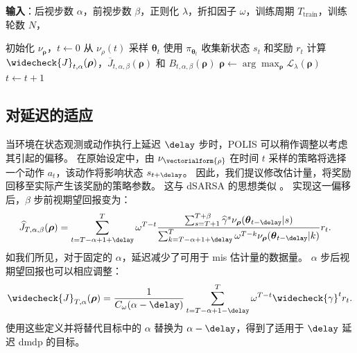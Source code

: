 \begin{algorithm}[t]
\caption{使用 POLIS 的终身学习}
\label{alg:cap}
\textbf{输入}：后视步数 $\alpha$，前视步数 $\beta$，正则化 $\lambda$，折扣因子 $\omega$，训练周期 $T_{\text{train}}$，训练轮数 $N$，
\begin{algorithmic}[1]
\STATE 初始化 $\nu_{\boldsymbol{\rho}}$，$t \gets 0$
    \STATE 从 $\nu_{\rho}(t)$ 采样 $\boldsymbol{\theta}_t$
    \STATE 使用 $\pi_{\boldsymbol{\theta}_t}$ 收集新状态 $s_t$ 和奖励 $r_t$
            \STATE 计算 $\widecheck{J}_{t,\alpha}({\boldsymbol{\rho}})$，$\overline{J}_{t,\alpha,\beta}({\boldsymbol{\rho}})$ 和 $B_{t,\alpha,\beta}(\boldsymbol{\rho})$
            \STATE $\boldsymbol{\rho} \gets \arg\max_{\boldsymbol{\rho}} \mathcal{L}_{\lambda}(\boldsymbol{\rho})$
         \ENDFOR
    \ENDIF
    \STATE $t \gets t+1$
\ENDWHILE
\end{algorithmic}
\end{algorithm}



\subsection{对延迟的适应}
\label{subsec:extension_delay_polis}
当环境在状态观测或动作执行上延迟 $\delay$ 步时，POLIS 可以稍作调整以考虑其引起的偏移。
在原始设定中，由 $\nu_{\vectorialform{\rho}}$ 在时间 $t$ 采样的策略将选择一个动作 $a_t$，该动作将影响状态 $s_{t+\delay}$。
因此，我们提议修改估计量，将奖励回移至实际产生该奖励的策略参数。
这与 dSARSA 的思想类似 \cite{schuitema2010control}。
实现这一偏移后，$\beta$ 步前视期望回报变为：
\begin{align*}
    \widehat{J}_{T,\alpha,\beta}({\boldsymbol\rho})
    & = \sum_{t=T-\alpha+1+\delay}^{T} \omega^{T-t} \frac{\sum_{s=T+1}^{T+\beta} \widehat{\gamma}^s \nu_{\boldsymbol\rho}(\boldsymbol\theta_{t-\delay}\vert s)}{\sum_{k=T-\alpha+1+\delay}^T \omega^{T-k} \nu_{\boldsymbol\rho}(\boldsymbol\theta_{t-\delay}\vert k)} r_{t}.
\end{align*}
如我们所见，对于固定的 $\alpha$，延迟减少了可用于 \gls{mis} 估计量的数据量。
$\alpha$ 步后视期望回报也可以相应调整：
\begin{align*}
    \widecheck{J}_{T,\alpha}({\boldsymbol\rho}) = \frac{1}{C_\omega(\alpha-\delay)} \sum_{t=T-\alpha+1-\delay}^{T} \omega^{T-t}  \widecheck{\gamma}^t r_{t}.
\end{align*}
使用这些定义并将替代目标中的 $\alpha$ 替换为 $\alpha-\delay$，得到了适用于 $\delay$ 延迟 \gls{dmdp} 的目标。
